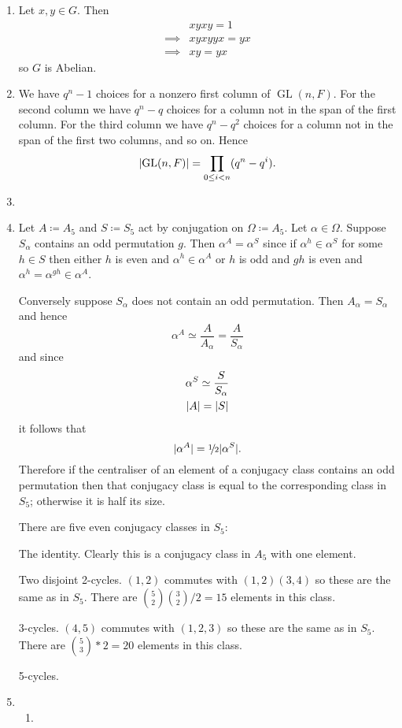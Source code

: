 \documentclass[a4paper, 12pt]{article}
\DeclarePairedDelimiter\abs{\lvert}{\rvert}
\DeclareMathOperator{\GL}{GL}
\begin{document}
\begin{enumerate}

\item Let \(x,y\in G\). Then
\begin{align*}
&xyxy=1\\
\implies{}&xyxyyx=yx\\
\implies{}&xy=yx
\end{align*}
so \(G\) is Abelian.

\item We have \(q^n-1\) choices for a nonzero first column of \(\GL(n,F)\). For the second column we have \(q^n-q\) choices for a column not in the span of the first column. For the third column we have \(q^n-q^2\) choices for a column not in the span of the first two columns, and so on. Hence
\[\abs{\GL(n,F)}=\prod_{0\leq i<n}(q^n-q^i).\]

\item

\item Let \(A\coloneqq A_5\) and \(S\coloneqq S_5\) act by conjugation on \(\Omega\coloneqq A_5\). Let \(\alpha\in\Omega\). Suppose \(S_\alpha\) contains an odd permutation \(g\). Then \(\alpha^A=\alpha^S\) since if \(\alpha^h\in\alpha^S\) for some \(h\in S\) then either \(h\) is even and \(\alpha^h\in\alpha^A\) or \(h\) is odd and \(gh\) is even and \(\alpha^h=\alpha^{gh}\in\alpha^A\).

Conversely suppose \(S_\alpha\) does not contain an odd permutation. Then \(A_\alpha=S_\alpha\) and hence
\[\alpha^A\simeq\frac A{A_\alpha}=\frac A{S_\alpha}\]
and since
\begin{gather*}
\alpha^S\simeq\frac S{S_\alpha}\\
\abs{A}=\abs{S}
\end{gather*}
it follows that
\[\abs{\alpha^A}=\sfrac{1\!}2\abs{\alpha^S}.\]
Therefore if the centraliser of an element of a conjugacy class contains an odd permutation then that conjugacy class is equal to the corresponding class in \(S_5\); otherwise it is half its size.

There are five even conjugacy classes in \(S_5\):

The identity. Clearly this is a conjugacy class in \(A_5\) with one element.

Two disjoint 2-cycles. \((1,2)\) commutes with \((1,2)(3,4)\) so these are the same as in \(S_5\). There are \(\binom52\binom32/2=15\) elements in this class.

3-cycles. \((4,5)\) commutes with \((1,2,3)\) so these are the same as in \(S_5\). There are \(\binom53*2=20\) elements in this class.

5-cycles. 

\item \begin{enumerate}

\item 

\end{enumerate}

\end{enumerate}
\end{document}
